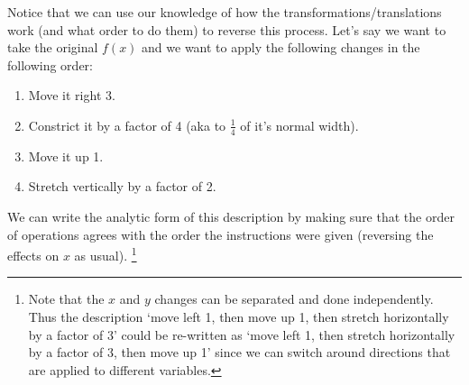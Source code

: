 \documentclass{ximera}
\begin{document}
    Notice that we can use our knowledge of how the transformations/translations work (and what order to do them) to reverse this process. Let's say we want to take the original $f(x)$ and we want to apply the following changes in the following order: 
    \begin{enumerate}
        \item Move it right 3.
        \item Constrict it by a factor of 4 (aka to $\frac{1}{4}$ of it's normal width).
        \item Move it up 1.
        \item Stretch vertically by a factor of 2. 
    \end{enumerate}
    
    We can write the analytic form of this description by making sure that the order of operations agrees with the order the instructions were given (reversing the effects on $x$ as usual).%
    \footnote{%
        Note that the $x$ and $y$ changes can be separated and done independently. Thus the description `move left 1, then move up 1, then stretch horizontally by a factor of 3' could be re-written as `move left 1, then stretch horizontally by a factor of 3, then move up 1' since we can switch around directions that are applied to different variables.%
        }
\end{document}
